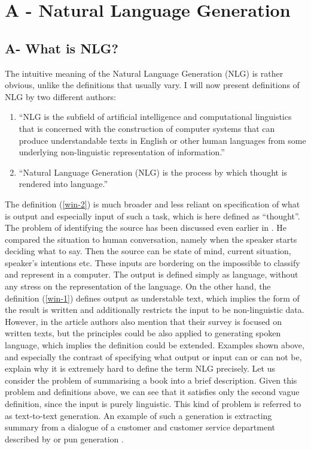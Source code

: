 \chapter{A - Natural Language Generation}

\section{A- What is NLG?}
The intuitive meaning of the Natural Language Generation (NLG) is rather obvious, unlike the definitions that usually vary. I will now present definitions of NLG by two different authors:
\begin{enumerate}
	\item “NLG is the subfield of artificial intelligence and computational linguistics that is concerned with the construction of computer systems that can produce understandable texts in English or other human languages from some underlying non-linguistic representation of information.”\label{win-1}\cite{reiter1997building}
	\item “Natural Language Generation (NLG) is the process by which thought is rendered into language.”\label{win-2}\cite{mcdonald2010natural}

\end{enumerate}

The  definition (\ref{win-2}) is much broader and less reliant on specification of what is output and especially input of such a task, which is here defined as “thought”. The problem of identifying the source has been discussed even earlier in \cite{mcdonald1993issues}. He compared the situation to human conversation, namely when the speaker starts deciding what to say. Then the source can be state of mind, current situation, speaker’s intentions etc. These inputs are bordering on the impossible to classify and represent in a computer. The output is defined simply as language, without any stress on the representation of the language. On the other hand, the definition (\ref{win-1}) defines output as understable text, which implies the form of the result is written and additionally restricts the input to be non-linguistic data. However, in the article authors also mention that their survey is focused on written texts, but the principles could be also applied to generating spoken language, which implies the definition could be extended. Examples shown above, and especially the contrast of specifying what output or input can or can not be, explain why it is extremely hard to define the term NLG precisely. 
Let us consider the problem of summarising a book into a brief description. Given this problem and definitions above, we can see that it satisfies only the second vague definition, since the input is purely linguistic. This kind of problem is referred to as text-to-text generation. An example of such a generation is extracting summary from a dialogue of a customer and customer service department described by \cite{liu2019automatic} or pun generation \cite{ritchie2005computational}.
 
